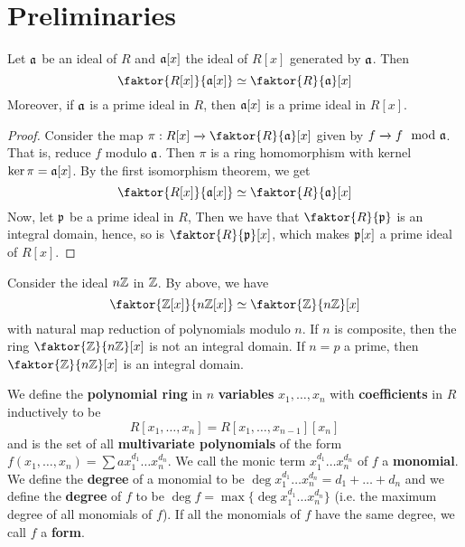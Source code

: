 \section{Preliminaries}\label{section_1.1}

\begin{theorem}\label{1.1.1}
    Let $\mathfrak{a}$ be an ideal of  $R$ and $\mathfrak{a}[x]$ the ideal of $R[x]$ generated by
    $\mathfrak{a}$. Then
    \begin{equation*}
        \faktor{R[x]}{\af[x]} \simeq \faktor{R}{\af}[x]
    \end{equation*}
    Moreover, if $\mathfrak{a}$ is a prime ideal in $R$, then $\mathfrak{a}[x]$ is a prime ideal in
    $R[x]$.
\end{theorem}
\begin{proof}
    Consider the map $\pi:R[x] \xrightarrow{} \faktor{R}{\af}[x]$ given by $f
    \xrightarrow{} f \mod{\mathfrak{a}}$. That is, reduce $f$ modulo  $\mathfrak{a}$.  Then $\pi$ is a
    ring homomorphism with kernel $\ker{\pi}=\mathfrak{a}[x]$. By the first isomorphism
    theorem, we get
    \begin{equation*}
        \faktor{R[x]}{\af[x]} \simeq \faktor{R}{\af}[x]
    \end{equation*}
    Now, let $\mathfrak{p}$ be a prime ideal in $R$, Then we have that $\faktor{R}{\pf}$ is
    an integral domain, hence, so is $\faktor{R}{\pf}[x]$, which makes $\mathfrak{p}[x]$ a
    prime ideal of $R[x]$.
\end{proof}

\begin{example}\label{example_1.1}
    Consider the ideal $n\mathbb{Z}$ in  $\mathbb{Z}$. By above, we have
    \begin{equation*}
        \faktor{\Z[x]}{n\Z[x]} \simeq \faktor{\Z}{n\Z}[x]
    \end{equation*}
    with natural map reduction of polynomials modulo $n$. If $n$ is composite,
    then the ring $\faktor{\Z}{n\Z}[x]$ is not an integral domain. If $n=p$ a
    prime, then  $\faktor{\Z}{n\Z}[x]$ is an integral domain.
\end{example}

\begin{definition}
    We define the \textbf{polynomial ring} in $n$  \textbf{variables} $x_1,
    \dots, x_n$ with \textbf{coefficients} in $R$ inductively to be
    \begin{equation*}
        R[x_1, \dots, x_n]=R[x_1, \dots, x_{n-1}][x_n]
    \end{equation*}
    and is the set of all \textbf{multivariate polynomials} of the form $f(x_1,
    \dots,x_n)=\sum{ax_1^{d_1} \dots x_n^{d_n}}$. We call the monic term
    $x_1^{d_1} \dots x_n^{d_n}$ of $f$ a  \textbf{monomial}. We define the
    \textbf{degree} of a monomial to be $\deg{x_1^{d_1} \dots
    x_n^{d_n}}=d_1+\dots+d_n$ and we define the \textbf{degree} of $f$ to be
    $\deg{f}=\max{\{\deg{x_1^{d_1} \dots x_n^{d_n}}\}}$ (i.e. the maximum degree
    of all monomials of $f$). If all the monomials of $f$ have the same degree,
    we call  $f$ a \textbf{form}.
\end{definition}

